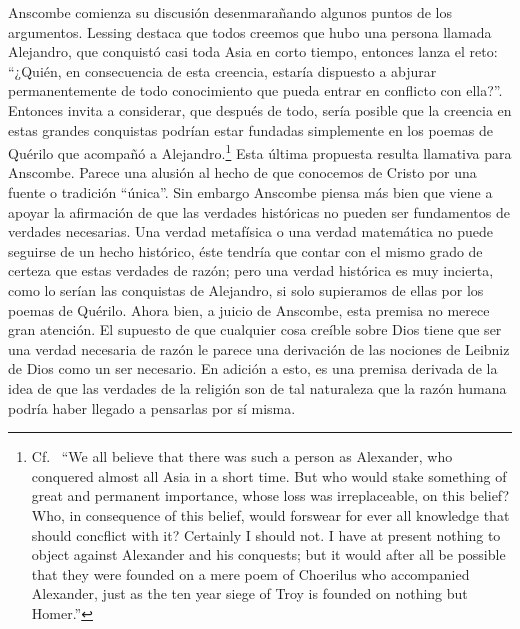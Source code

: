 Anscombe comienza su discusión desenmarañando algunos puntos de los argumentos.
Lessing destaca que todos creemos que hubo una persona llamada Alejandro, que
conquistó casi toda Asia en corto tiempo, entonces lanza el reto:
\enquote{¿Quién, en consecuencia de esta creencia, estaría dispuesto a abjurar
  permanentemente de todo conocimiento que pueda entrar en conflicto con ella?}.
Entonces invita a considerar, que después de todo, sería posible que la creencia
en estas grandes conquistas podrían estar fundadas simplemente en los poemas de
Quérilo que acompañó a Alejandro.\footnote{Cf.~ \enquote{We all believe that
    there was such a person as Alexander, who conquered almost all Asia in a
    short time. But who would stake something of great and permanent importance,
    whose loss was irreplaceable, on this belief? Who, in consequence of this
    belief, would forswear for ever all knowledge that should concflict with it?
    Certainly I should not. I have at present nothing to object against
    Alexander and his conquests; but it would after all be possible that they
    were founded on a mere poem of Choerilus who accompanied Alexander, just as
    the ten year siege of Troy is founded on nothing but Homer.}} Esta última
propuesta resulta llamativa para Anscombe. Parece una alusión al hecho de que
conocemos de Cristo por una fuente o tradición \enquote{única}. Sin embargo
Anscombe piensa más bien que viene a apoyar la afirmación de que las verdades
históricas no pueden ser fundamentos de verdades necesarias. Una verdad
metafísica o una verdad matemática no puede seguirse de un hecho histórico, éste
tendría que contar con el mismo grado de certeza que estas verdades de razón;
pero una verdad histórica es muy incierta, como lo serían las conquistas de
Alejandro, si solo supieramos de ellas por los poemas de Quérilo. Ahora bien, a
juicio de Anscombe, esta premisa no merece gran atención. El supuesto de que
cualquier cosa creíble sobre Dios tiene que ser una verdad necesaria de razón le
parece una derivación de las nociones de Leibniz de Dios como un ser necesario.
En adición a esto, es una premisa derivada de la idea de que las verdades de la
religión son de tal naturaleza que la razón humana podría haber llegado a
pensarlas por sí misma.

